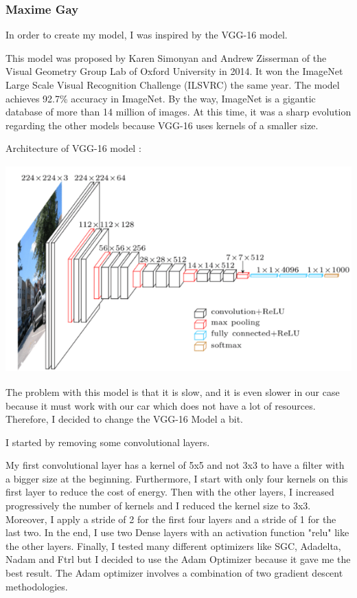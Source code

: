 \documentclass[12pt]{article}
\begin{document}
\subsubsection{Maxime Gay}
In order to create my model, I was inspired by the VGG-16 model.

This model was proposed by Karen Simonyan and Andrew Zisserman of the Visual Geometry Group Lab of Oxford University in 2014. It won the ImageNet Large Scale Visual Recognition Challenge (ILSVRC) the same year. The model achieves 92.7\% accuracy in ImageNet. By the way, ImageNet is a gigantic database of more than 14 million of images. At this time, it was a sharp evolution regarding the other models because VGG-16 uses kernels of a smaller size.


Architecture of VGG-16 model :

\centerline{\includegraphics[height=8cm]{../../docs/VGG16.png}}

The problem with this model is that it is slow, and it is even slower in our case because it must work with our car which does not have a lot of resources. Therefore, I decided to change the VGG-16 Model a bit.  

I started by removing some convolutional layers. 

My first convolutional layer has a kernel of 5x5 and not 3x3 to have a filter with a bigger size at the beginning. Furthermore, I start with only four kernels on this first layer to reduce the cost of energy. Then with the other layers, I increased progressively the number of kernels and I reduced the kernel size to 3x3. Moreover, I apply a stride of 2 for the first four layers and a stride of 1 for the last two. In the end, I use two Dense layers with an activation function "relu" like the other layers. Finally, I tested many different optimizers like SGC, Adadelta, Nadam and Ftrl but I decided to use the Adam Optimizer because it gave me the best result. The Adam optimizer involves a combination of two gradient descent methodologies. 
\end{document}

